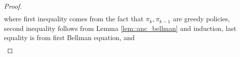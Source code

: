 \documentclass[10pt,a4paper]{amsart}
\newcommand{\cP}{\mathcal{P}}
\newcommand*{\para}[1]{\left({#1}\right)}
\begin{document}
\begin{proof}
\begin{align*}
\end{align*}   
where first inequality comes from the fact that $\pi_{k}, \pi_{k-1}$ are greedy policies, second inequality follows from Lemma \ref{lem::anc_bellman} and induction, last equality is from first Bellman equation, and 
\begin{align*}

\end{align*}
\end{proof}
\end{document}

